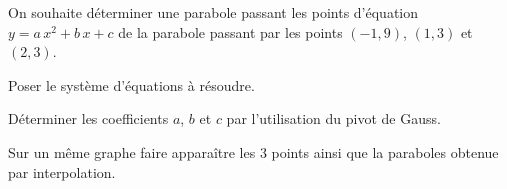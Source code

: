 


On souhaite déterminer une parabole passant les points d'équation $y=a\,x^2+b\,x+c$ de la parabole passant par les points $(-1,9)$, $(1,3)$ et $(2,3)$.

\question{} Poser le système d'équations à résoudre.

\question{} Déterminer les coefficients $a$, $b$ et $c$ par l'utilisation du pivot de Gauss.

\question{} Sur un même graphe faire apparaître les 3 points ainsi que la paraboles obtenue par interpolation.